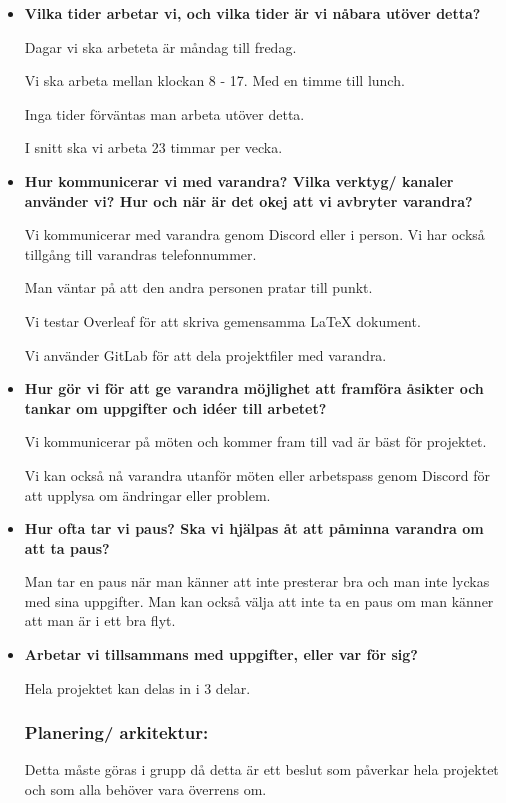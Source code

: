 \documentclass{mall}
\begin{document}
\begin{itemize}
\item \textbf{Vilka tider arbetar vi, och vilka tider är vi nåbara utöver detta?}

  Dagar vi ska arbeteta är måndag till fredag.

  Vi ska arbeta mellan klockan 8 - 17. Med en timme till lunch.

  Inga tider förväntas man arbeta utöver detta.

  I snitt ska vi arbeta 23 timmar per vecka.

\item \textbf{Hur kommunicerar vi med varandra? Vilka verktyg/ kanaler använder vi? Hur och när är det okej att vi avbryter varandra?}

  Vi kommunicerar med varandra genom Discord eller i person. Vi har också tillgång till varandras telefonnummer.
  
  Man väntar på att den andra personen pratar till punkt.

  Vi testar Overleaf för att skriva gemensamma LaTeX dokument.

  Vi använder GitLab för att dela projektfiler med varandra.

\item \textbf{Hur gör vi för att ge varandra möjlighet att framföra åsikter och tankar om uppgifter och idéer till arbetet?}

  Vi kommunicerar på möten och kommer fram till vad är bäst för projektet.

  Vi kan också nå varandra utanför möten eller arbetspass genom Discord för att upplysa om ändringar eller problem.

\item \textbf{Hur ofta tar vi paus? Ska vi hjälpas åt att påminna varandra om att ta paus?}

  Man tar en paus när man känner att inte presterar bra och man inte lyckas med sina uppgifter. Man kan också välja att inte ta en paus om man känner att man är i ett bra flyt.

\item \textbf{Arbetar vi tillsammans med uppgifter, eller var för sig?}

  Hela projektet kan delas in i 3 delar.

  \subsubsection{Planering/ arkitektur:}
  Detta måste göras i grupp då detta är ett beslut som påverkar hela projektet och som alla behöver vara överrens om.
  

\end{itemize}
\end{document}
